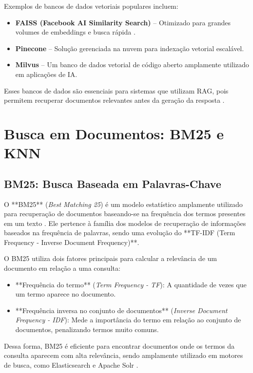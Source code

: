 Exemplos de bancos de dados vetoriais populares incluem:
\begin{itemize}
    \item \textbf{FAISS (Facebook AI Similarity Search)} – Otimizado para grandes volumes de embeddings e busca rápida \cite{johnson2019billion}.
    \item \textbf{Pinecone} – Solução gerenciada na nuvem para indexação vetorial escalável.
    \item \textbf{Milvus} – Um banco de dados vetorial de código aberto amplamente utilizado em aplicações de IA.
\end{itemize}

Esses bancos de dados são essenciais para sistemas que utilizam RAG, pois permitem recuperar documentos relevantes antes da geração da resposta \cite{jiang2021efficient}.

\section{Busca em Documentos: BM25 e KNN}

\subsection{BM25: Busca Baseada em Palavras-Chave}

O **BM25** (\textit{Best Matching 25}) é um modelo estatístico amplamente utilizado para recuperação de documentos baseando-se na frequência dos termos presentes em um texto \cite{robertson2009probabilistic}. Ele pertence à família dos modelos de recuperação de informações baseados na frequência de palavras, sendo uma evolução do **TF-IDF (Term Frequency - Inverse Document Frequency)**.

O BM25 utiliza dois fatores principais para calcular a relevância de um documento em relação a uma consulta:
\begin{itemize}
    \item **Frequência do termo** (\textit{Term Frequency - TF}): A quantidade de vezes que um termo aparece no documento.
    \item **Frequência inversa no conjunto de documentos** (\textit{Inverse Document Frequency - IDF}): Mede a importância do termo em relação ao conjunto de documentos, penalizando termos muito comuns.
\end{itemize}

Dessa forma, BM25 é eficiente para encontrar documentos onde os termos da consulta aparecem com alta relevância, sendo amplamente utilizado em motores de busca, como Elasticsearch e Apache Solr \cite{manning2008introduction}.

